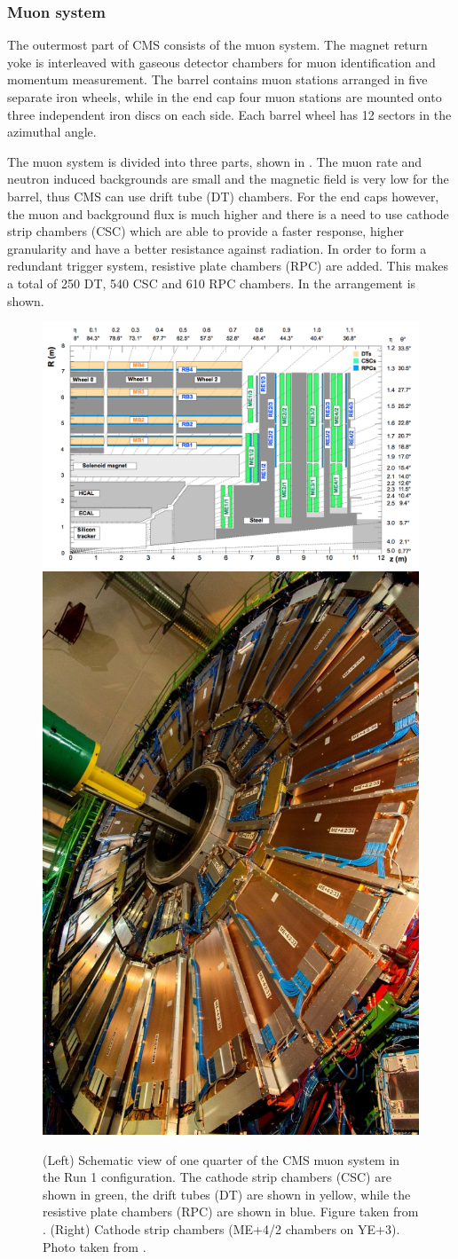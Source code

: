\clearpage
\subsubsection{Muon system}
\label{sec:MUO}
The outermost part of CMS consists of the muon system. The magnet return yoke is interleaved with gaseous detector chambers for muon identification and momentum measurement. The barrel contains muon stations arranged in five separate iron wheels, while in the end cap four muon stations are mounted onto three independent iron discs on each side. Each barrel wheel has 12 sectors in the azimuthal angle. 

The muon system is divided into three parts, shown in . The muon rate and neutron induced backgrounds are small and the magnetic field is very low for the barrel, thus CMS can use drift tube (DT) chambers. For the end caps however, the muon and background flux is much higher and there is a need to use cathode strip chambers (CSC) which are able to provide a faster response, higher granularity and have a better resistance against radiation. In order to form a redundant trigger system, resistive plate chambers (RPC) are added. This makes a total of 250 DT, 540 CSC and 610 RPC chambers. In  the arrangement is shown.
\begin{figure}[htbp]
	\centering
	\includegraphics[width=.69\textwidth]{2_ExperimentalSetup/Figures/muonsys}
	\includegraphics[width=0.3\linewidth]{2_ExperimentalSetup/Figures/NfP5131122image6}
	\caption{(Left) Schematic view of one quarter of the CMS muon system in the Run 1 configuration. The cathode strip chambers (CSC) are shown in green, the drift tubes (DT) are shown in yellow, while the resistive plate chambers (RPC) are shown in blue. Figure  taken from \cite{Chatrchyan:1223944}. (Right) Cathode strip chambers (ME+4/2 chambers on YE+3). Photo taken from \cite{muon}.}
	\label{fig:muonsys}
\end{figure}



